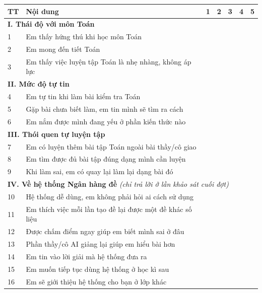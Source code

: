 \documentclass[12pt,a4paper]{article}
\begin{document}
\vspace{4pt}
\begin{longtable}{|p{0.7cm}|p{10.6cm}|c|c|c|c|c|}
\hline
\textbf{TT} & \textbf{Nội dung} & \textbf{1} & \textbf{2} & \textbf{3} & \textbf{4} & \textbf{5} \\ \hline
\endhead

\multicolumn{7}{|l|}{\textbf{I. Thái độ với môn Toán}} \\ \hline
1 & Em thấy hứng thú khi học môn Toán & & & & & \\ \hline
2 & Em mong đến tiết Toán & & & & & \\ \hline
3 & Em thấy việc luyện tập Toán là nhẹ nhàng, không áp lực & & & & & \\ \hline

\multicolumn{7}{|l|}{\textbf{II. Mức độ tự tin}} \\ \hline
4 & Em tự tin khi làm bài kiểm tra Toán & & & & & \\ \hline
5 & Gặp bài chưa biết làm, em tin mình sẽ tìm ra cách & & & & & \\ \hline
6 & Em nắm được mình đang yếu ở phần kiến thức nào & & & & & \\ \hline

\multicolumn{7}{|l|}{\textbf{III. Thói quen tự luyện tập}} \\ \hline
7 & Em có luyện thêm bài tập Toán ngoài bài thầy/cô giao & & & & & \\ \hline
8 & Em tìm được đủ bài tập đúng dạng mình cần luyện & & & & & \\ \hline
9 & Khi làm sai, em có quay lại làm lại dạng bài đó & & & & & \\ \hline

\multicolumn{7}{|l|}{\textbf{IV. Về hệ thống Ngân hàng đề} \textit{(chỉ trả lời ở lần khảo sát cuối đợt)}} \\ \hline
10 & Hệ thống dễ dùng, em không phải hỏi ai cách sử dụng & & & & & \\ \hline
11 & Em thích việc mỗi lần tạo đề lại được một đề khác số liệu & & & & & \\ \hline
12 & Được chấm điểm ngay giúp em biết mình sai ở đâu & & & & & \\ \hline
13 & Phần thầy/cô AI giảng lại giúp em hiểu bài hơn & & & & & \\ \hline
14 & Em tin vào lời giải mà hệ thống đưa ra & & & & & \\ \hline
15 & Em muốn tiếp tục dùng hệ thống ở học kì sau & & & & & \\ \hline
16 & Em sẽ giới thiệu hệ thống cho bạn ở lớp khác & & & & & \\ \hline
\end{longtable}
\end{document}

